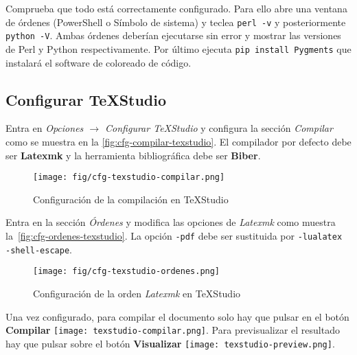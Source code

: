 Comprueba que todo está correctamente configurado.  Para ello abre una ventana de órdenes (PowerShell o Símbolo de sistema) y teclea \texttt{perl -v} y posteriormente \texttt{python -V}. Ambas órdenes deberían ejecutarse sin error y mostrar las versiones de Perl y Python respectivamente. Por último ejecuta \texttt{pip install Pygments} que instalará el software de coloreado de código.

\subsection{Configurar TeXStudio}

Entra en \emph{Opciones $\rightarrow$ Configurar TeXStudio} y configura la sección \emph{Compilar} como se muestra en la \autoref{fig:cfg-compilar-texstudio}. El compilador por defecto debe ser \textbf{Latexmk} y la herramienta bibliográfica debe ser \textbf{Biber}.

\begin{figure}
    \centering
    \texttt{[image: fig/cfg-texstudio-compilar.png]}
    \caption{Configuración de la compilación en TeXStudio}
    \label{fig:cfg-compilar-texstudio}
\end{figure}

Entra en la sección \emph{Órdenes} y modifica las opciones de \emph{Latexmk} como muestra la~\autoref{fig:cfg-ordenes-texstudio}. La opción \texttt{-pdf} debe ser sustituida por \texttt{-lualatex -shell-escape}.

\begin{figure}
    \centering
    \texttt{[image: fig/cfg-texstudio-ordenes.png]}
    \caption{Configuración de la orden \emph{Latexmk} en TeXStudio}
    \label{fig:cfg-ordenes-texstudio}
\end{figure}

Una vez configurado, para compilar el documento solo hay que pulsar en el botón \textbf{Compilar} \texttt{[image: texstudio-compilar.png]}. Para previsualizar el resultado hay que pulsar sobre el botón \textbf{Visualizar} \texttt{[image: texstudio-preview.png]}.